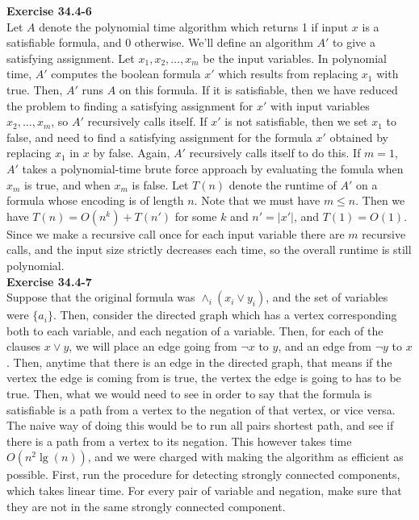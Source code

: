 \documentclass{article}
\begin{document}
\noindent\textbf{Exercise 34.4-6}\\

Let $A$ denote the polynomial time algorithm which returns 1 if input $x$ is a satisfiable formula, and 0 otherwise.  We'll define an algorithm $A'$ to give a satisfying assignment.  Let $x_1, x_2, \ldots, x_m$ be the input variables.  In polynomial time, $A'$ computes the boolean formula $x'$ which results from replacing $x_1$ with true. Then, $A'$ runs $A$ on this formula.  If it is satisfiable, then we have reduced the problem to finding a satisfying assignment for $x'$ with input variables $x_2, \ldots, x_m$, so $A'$ recursively calls itself.  If $x'$ is not satisfiable, then we set $x_1$ to false, and need to find a satisfying assignment for the formula $x'$ obtained by replacing $x_1$ in $x$ by false.  Again, $A'$ recursively calls itself to do this.  If $m=1$, $A'$ takes a polynomial-time brute force approach by evaluating the fomula when $x_m$ is true, and when $x_m$ is false.  Let $T(n)$ denote the runtime of $A'$ on a formula whose encoding is of length $n$.  Note that we must have $m \leq n$.  Then we have $T(n) = O(n^k) + T(n')$ for some $k$ and $n' = |x'|$, and $T(1) = O(1)$.  Since we make a recursive call once for each input variable there are $m$ recursive calls, and the input size strictly decreases each time, so the overall runtime is still polynomial.  \\

\noindent\textbf{Exercise 34.4-7}\\
Suppose that the original formula was $\wedge_i (x_i \vee y_i)$, and the set of variables were $\{a_i\}$. Then, consider the directed graph which has a vertex corresponding both to each variable, and each negation of a variable. Then, for each of the clauses $x \vee y$, we will place an edge going from $\neg x$ to $y$, and an edge from $\neg y$ to $x$. Then, anytime that there is an edge in the directed graph, that means if the vertex the edge is coming from is true, the vertex the edge is going to has to be true. Then, what we would need to see in order to say that the formula is satisfiable is a path from a vertex to the negation of that vertex, or vice versa. The naive way of doing this would be to run all pairs shortest path, and see if there is a path from a vertex to its negation. This however takes time $O(n^2\lg(n))$, and we were charged with making the algorithm as efficient as possible. First, run the procedure for detecting strongly connected components, which takes linear time. For every pair of variable and negation, make sure that they are not in the same strongly connected component.%
\end{document}
